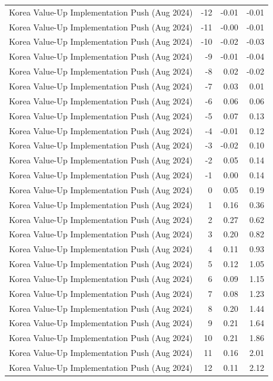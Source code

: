 \begin{table}
\begin{tabular}{lrrr}
Korea Value-Up Implementation Push (Aug 2024) & -12 & -0.01 & -0.01 \\
Korea Value-Up Implementation Push (Aug 2024) & -11 & -0.00 & -0.01 \\
Korea Value-Up Implementation Push (Aug 2024) & -10 & -0.02 & -0.03 \\
Korea Value-Up Implementation Push (Aug 2024) & -9 & -0.01 & -0.04 \\
Korea Value-Up Implementation Push (Aug 2024) & -8 & 0.02 & -0.02 \\
Korea Value-Up Implementation Push (Aug 2024) & -7 & 0.03 & 0.01 \\
Korea Value-Up Implementation Push (Aug 2024) & -6 & 0.06 & 0.06 \\
Korea Value-Up Implementation Push (Aug 2024) & -5 & 0.07 & 0.13 \\
Korea Value-Up Implementation Push (Aug 2024) & -4 & -0.01 & 0.12 \\
Korea Value-Up Implementation Push (Aug 2024) & -3 & -0.02 & 0.10 \\
Korea Value-Up Implementation Push (Aug 2024) & -2 & 0.05 & 0.14 \\
Korea Value-Up Implementation Push (Aug 2024) & -1 & 0.00 & 0.14 \\
Korea Value-Up Implementation Push (Aug 2024) & 0 & 0.05 & 0.19 \\
Korea Value-Up Implementation Push (Aug 2024) & 1 & 0.16 & 0.36 \\
Korea Value-Up Implementation Push (Aug 2024) & 2 & 0.27 & 0.62 \\
Korea Value-Up Implementation Push (Aug 2024) & 3 & 0.20 & 0.82 \\
Korea Value-Up Implementation Push (Aug 2024) & 4 & 0.11 & 0.93 \\
Korea Value-Up Implementation Push (Aug 2024) & 5 & 0.12 & 1.05 \\
Korea Value-Up Implementation Push (Aug 2024) & 6 & 0.09 & 1.15 \\
Korea Value-Up Implementation Push (Aug 2024) & 7 & 0.08 & 1.23 \\
Korea Value-Up Implementation Push (Aug 2024) & 8 & 0.20 & 1.44 \\
Korea Value-Up Implementation Push (Aug 2024) & 9 & 0.21 & 1.64 \\
Korea Value-Up Implementation Push (Aug 2024) & 10 & 0.21 & 1.86 \\
Korea Value-Up Implementation Push (Aug 2024) & 11 & 0.16 & 2.01 \\
Korea Value-Up Implementation Push (Aug 2024) & 12 & 0.11 & 2.12 \\

\end{tabular}
\end{table}
